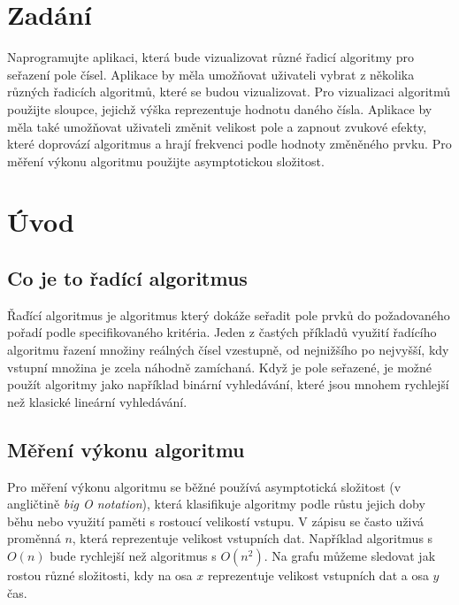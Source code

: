 \documentclass{article}
\begin{document}
\pagebreak

\tableofcontents
\pagebreak

\section{Zadání}
Naprogramujte aplikaci, která bude vizualizovat různé řadicí algoritmy pro seřazení pole čísel. Aplikace by měla umožňovat uživateli vybrat z několika různých řadicích algoritmů, které se budou vizualizovat. Pro vizualizaci algoritmů použijte sloupce, jejichž výška reprezentuje hodnotu daného čísla. Aplikace by měla také umožňovat uživateli změnit velikost pole a zapnout zvukové efekty, které doprovází algoritmus a hrají frekvenci podle hodnoty změněného prvku. Pro měření výkonu algoritmu použijte asymptotickou složitost.

\section{Úvod}
\subsection{Co je to řadící algoritmus}
Řaďící algoritmus je algoritmus který dokáže seřadit pole prvků do požadovaného pořadí podle specifikovaného kritéria. Jeden z častých příkladů využití řadícího algoritmu řazení množiny reálných čísel vzestupně, od nejnižšího po nejvyšší, kdy vstupní množina je zcela náhodně zamíchaná. Když je pole seřazené, je možné použít algoritmy jako například binární vyhledávání, které jsou mnohem rychlejší než klasické lineární vyhledávání.

\subsection{Měření výkonu algoritmu}
Pro měření výkonu algoritmu se běžné používá asymptotická složitost (v angličtině \textit{big O notation}), která klasifikuje algoritmy podle růstu jejich doby běhu nebo využití paměti s rostoucí velikostí vstupu. V zápisu se často uživá proměnná \(n\), která reprezentuje velikost vstupních dat. Například algoritmus s \(O(n)\) bude rychlejší než algoritmus s \(O(n^2)\). Na grafu můžeme sledovat jak rostou různé složitosti, kdy na osa \(x\) reprezentuje velikost vstupních dat a osa \(y\) čas.
\end{document}
